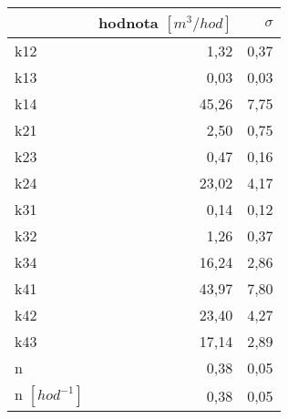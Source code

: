 \begin{tabular}{lrr}
\toprule
{} &  hodnota $\left[\si{m^3/hod}\right]$ &  $\sigma$ \\
\midrule
k12                 &                                 1,32 &      0,37 \\
k13                 &                                 0,03 &      0,03 \\
k14                 &                                45,26 &      7,75 \\
k21                 &                                 2,50 &      0,75 \\
k23                 &                                 0,47 &      0,16 \\
k24                 &                                23,02 &      4,17 \\
k31                 &                                 0,14 &      0,12 \\
k32                 &                                 1,26 &      0,37 \\
k34                 &                                16,24 &      2,86 \\
k41                 &                                43,97 &      7,80 \\
k42                 &                                23,40 &      4,27 \\
k43                 &                                17,14 &      2,89 \\
n                   &                                 0,38 &      0,05 \\
n $[\si{hod^{-1}}]$ &                                 0,38 &      0,05 \\
\bottomrule
\end{tabular}
